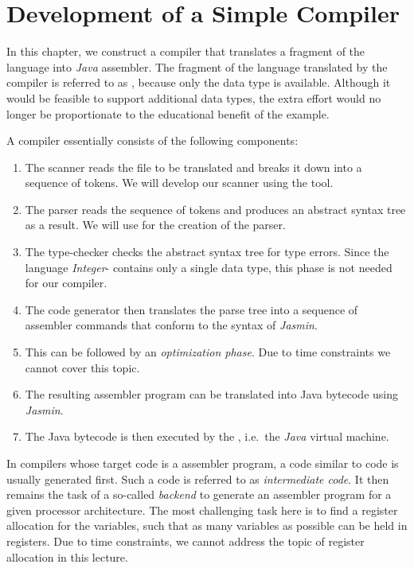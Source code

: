 \chapter{Development of a Simple Compiler}
In this chapter, we construct a compiler that translates a fragment of the  language into \textsl{Java}
assembler. The fragment of the  language translated by the compiler is referred to as
,  because only the data type  is
available. Although it would be feasible to support additional data types, the extra effort would no longer be
proportionate to the educational benefit of the example. 

A compiler essentially consists of the following components:
\begin{enumerate}
\item The scanner reads the file to be translated and breaks it down into a sequence of tokens. We will develop
      our scanner using the  tool. 
\item The parser reads the sequence of tokens and produces an abstract syntax tree as a result. We will 
      use  for the creation of the parser. 
\item The type-checker checks the abstract syntax tree for type errors. Since the language
      \textsl{Integer}- contains only a single data type, this phase is not needed for our compiler. 
\item The code generator then translates the parse tree into a sequence of assembler commands that conform to
      the syntax of \textsl{Jasmin}. 
\item This can be followed by an \emph{optimization phase}.   Due to time constraints we cannot cover this
      topic. 
\item The resulting assembler program can be translated into Java bytecode using \textsl{Jasmin}.
\item The Java bytecode is then executed by the , i.e.~the \textsl{Java} virtual machine.
\end{enumerate}
In compilers whose target code is a  assembler program, a code similar to  code is
usually generated first. Such a code is referred to as \emph{intermediate code}. It then remains the task of a
so-called \emph{backend} to generate an assembler program for a given processor architecture. The most
challenging task here is to find a register allocation for the variables, such that as many variables as
possible can be held in registers. Due to time constraints, we cannot address the topic of register allocation 
in this lecture.

